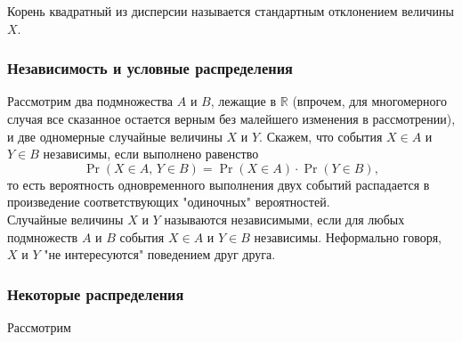 \documentclass[12pt,a4paper]{book}
\begin{document}
Корень квадратный из дисперсии называется стандартным отклонением величины $X$.
\subsubsection{Независимость и условные распределения}
Рассмотрим два подмножества $A$ и $B$, лежащие в $\mathbb{R}$ (впрочем, для многомерного случая все сказанное остается верным без малейшего изменения в рассмотрении), и две одномерные случайные величины $X$ и $Y$. Скажем, что события $X \in A$ и $Y \in B$ независимы, если выполнено равенство
$$ \Pr \left( X \in A, \, Y \in B \right) = \Pr \left( X \in A \right) \cdot \Pr \left( Y \in B \right), $$
то есть вероятность одновременного выполнения двух событий распадается в произведение соответствующих "одиночных" вероятностей.\\

Случайные величины $X$ и $Y$ называются независимыми, если для любых подмножеств $A$ и $B$ события $X \in A$ и $Y \in B$ независимы. Неформально говоря, $X$ и $Y$ "не интересуются" поведением друг друга.
\subsubsection{Некоторые распределения}
Рассмотрим 
\end{document}
